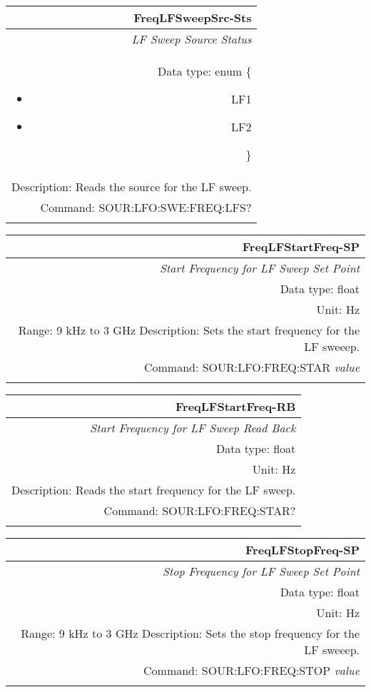 \documentclass[openany]{article}
\begin{document}
		\begin{tabular}{N}
			\hline
			\bfseries FreqLFSweepSrc-Sts \\ \hline
			\emph{LF Sweep Source Status} \\
			Data type: enum \{\begin{itemize}[noitemsep]
				\small
				\item[] LF1
				\item[] LF2
			\end{itemize}\} \\ 
			Description: Reads the source for the LF sweep. \\
			Command: SOUR:LFO:SWE:FREQ:LFS? \\
			\\

		\end{tabular}


		\begin{tabular}{N}
			\hline
			\bfseries FreqLFStartFreq-SP \\ \hline
			\emph{Start Frequency for LF Sweep Set Point} \\
			Data type: float \\
			Unit: Hz \\ 
			Range: 9 kHz to 3 GHz
			Description: Sets the start frequency for the LF sweeep.\\
			Command: SOUR:LFO:FREQ:STAR \emph{value} \\
			\\
			
		\end{tabular}


		\begin{tabular}{N}
			\hline
			\bfseries FreqLFStartFreq-RB \\ \hline
			\emph{Start Frequency for LF Sweep Read Back} \\
			Data type: float \\
			Unit: Hz \\
			Description: Reads the start frequency for the LF sweep. \\
			Command: SOUR:LFO:FREQ:STAR? \\
			\\

		\end{tabular}


		\begin{tabular}{N}
			\hline
			\bfseries FreqLFStopFreq-SP \\ \hline
			\emph{Stop Frequency for LF Sweep Set Point} \\
			Data type: float \\
			Unit: Hz \\ 
			Range: 9 kHz to 3 GHz
			Description: Sets the stop frequency for the LF sweeep.\\
			Command: SOUR:LFO:FREQ:STOP \emph{value} \\
			\\
			
		\end{tabular}
\end{document}
